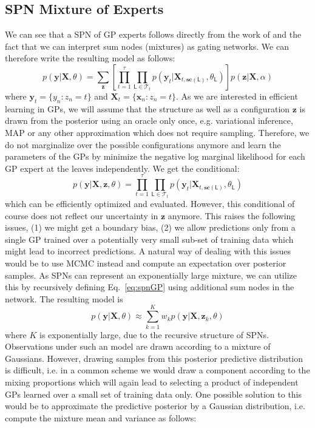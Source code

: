 \documentclass[10pt,letterpaper]{article}
\newcommand{\SPT}{\mathcal{T}}
\newcommand{\X}{\mathbf{X}}
\newcommand{\x}{\mathbf{x}}
\newcommand{\y}{\mathbf{y}}
\newcommand{\z}{\mathbf{z}}
\newcommand{\Leaf}{\mathsf{L}}
\newcommand{\scope}{\ensuremath{\mathbf{sc}}} %
\theoremstyle{mystyle}
\begin{document}
\subsection{SPN Mixture of Experts}
We can see that a SPN of GP experts follows directly from the work of \cite{RasmussenG2001} and the fact that we can interpret sum nodes (mixtures) as gating networks.
We can therefore write the resulting model as follows:
\begin{equation} \label{eq:spnGP}
  p(\y | \X, \theta) = \sum_{\z} \left[ \prod_{t=1}^{\tau} \prod_{\Leaf \in \SPT_{t}} p(\y_t | \X_{t,\scope(\Leaf)}, \theta_{\Leaf}) \right] p(\z | \X, \alpha)
\end{equation}
where $\y_t = \{y_n : z_n = t\}$ and $\X_t = \{\x_n : z_n = t\}$.
As we are interested in efficient learning in GPs, we will assume that the structure as well as a configuration $\z$ is drawn from the posterior using an oracle only once, e.g. variational inference, MAP or any other approximation which does not require sampling.
Therefore, we do not marginalize over the possible configurations anymore and learn the parameters of the GPs by minimize the negative log marginal likelihood for each GP expert at the leaves independently.
We get the conditional:
\[
  p(\y | \X, \z, \theta) = \prod_{t=1}^{\tau} \prod_{\Leaf \in \SPT_{t}} p(\y_t | \X_{t,\scope(\Leaf)}, \theta_{\Leaf})
\]
which can be efficiently optimized and evaluated.
However, this conditional of course does not reflect our uncertainty in $\z$ anymore.
This raises the following issues, (1) we might get a boundary bias, (2) we allow predictions only from a single GP trained over a potentially very small sub-set of training data which might lead to incorrect predictions.
A natural way of dealing with this issues would be to use MCMC instead and compute an expectation over posterior samples.
As SPNs can represent an exponentially large mixture, we can utilize this by recursively defining Eq.~\ref{eq:spnGP} using additional sum nodes in the network.
The resulting model is
\[
  p(\y | \X, \theta) \approx \sum_{k=1}^K w_k p(\y | \X, \z_k, \theta)
\]
where $K$ is exponentially large, due to the recursive structure of SPNs. Observations under such an model are drawn according to a mixture of Gaussians.
However, drawing samples from this posterior predictive distribution is difficult, i.e. in a common scheme we would draw a component according to the mixing proportions which will again lead to selecting a product of independent GPs learned over a small set of training data only. 
One possible solution to this would be to approximate the predictive posterior by a Gaussian distribution, i.e. compute the mixture mean and variance as follows: 
\end{document}
